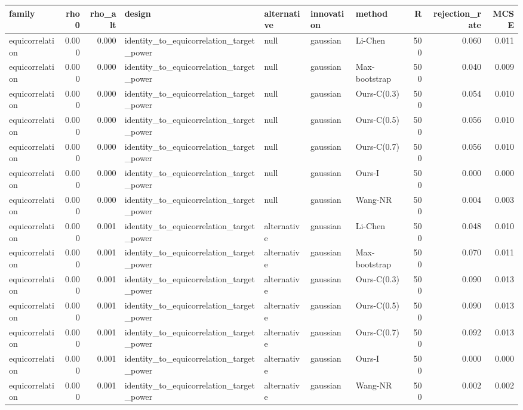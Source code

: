 \begin{tabular}{lrrllllrrr}
\toprule
family & rho0 & rho\_alt & design & alternative & innovation & method & R & rejection\_rate & MCSE \\
\midrule
equicorrelation & 0.000 & 0.000 & identity\_to\_equicorrelation\_target\_power & null & gaussian & Li-Chen & 500 & 0.060 & 0.011 \\
equicorrelation & 0.000 & 0.000 & identity\_to\_equicorrelation\_target\_power & null & gaussian & Max-bootstrap & 500 & 0.040 & 0.009 \\
equicorrelation & 0.000 & 0.000 & identity\_to\_equicorrelation\_target\_power & null & gaussian & Ours-C(0.3) & 500 & 0.054 & 0.010 \\
equicorrelation & 0.000 & 0.000 & identity\_to\_equicorrelation\_target\_power & null & gaussian & Ours-C(0.5) & 500 & 0.056 & 0.010 \\
equicorrelation & 0.000 & 0.000 & identity\_to\_equicorrelation\_target\_power & null & gaussian & Ours-C(0.7) & 500 & 0.056 & 0.010 \\
equicorrelation & 0.000 & 0.000 & identity\_to\_equicorrelation\_target\_power & null & gaussian & Ours-I & 500 & 0.000 & 0.000 \\
equicorrelation & 0.000 & 0.000 & identity\_to\_equicorrelation\_target\_power & null & gaussian & Wang-NR & 500 & 0.004 & 0.003 \\
equicorrelation & 0.000 & 0.001 & identity\_to\_equicorrelation\_target\_power & alternative & gaussian & Li-Chen & 500 & 0.048 & 0.010 \\
equicorrelation & 0.000 & 0.001 & identity\_to\_equicorrelation\_target\_power & alternative & gaussian & Max-bootstrap & 500 & 0.070 & 0.011 \\
equicorrelation & 0.000 & 0.001 & identity\_to\_equicorrelation\_target\_power & alternative & gaussian & Ours-C(0.3) & 500 & 0.090 & 0.013 \\
equicorrelation & 0.000 & 0.001 & identity\_to\_equicorrelation\_target\_power & alternative & gaussian & Ours-C(0.5) & 500 & 0.090 & 0.013 \\
equicorrelation & 0.000 & 0.001 & identity\_to\_equicorrelation\_target\_power & alternative & gaussian & Ours-C(0.7) & 500 & 0.092 & 0.013 \\
equicorrelation & 0.000 & 0.001 & identity\_to\_equicorrelation\_target\_power & alternative & gaussian & Ours-I & 500 & 0.000 & 0.000 \\
equicorrelation & 0.000 & 0.001 & identity\_to\_equicorrelation\_target\_power & alternative & gaussian & Wang-NR & 500 & 0.002 & 0.002 \\

\end{tabular}
